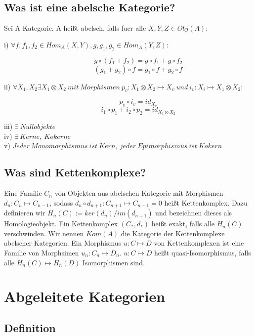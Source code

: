 \documentclass[12pt]{article}
\begin{document}
\subsection{Was ist eine abelsche Kategorie?}

Sei A Kategorie. A heißt abelsch, falls fuer alle $X,Y,Z \in Obj(A)$:
\begin{description}
    \item[i) $\forall f,f_1,f_2 \in Hom_A(X,Y), g,g_1,g_2 \in Hom_A(Y,Z):$]
        \[g \circ (f_1 + f_2) = g \circ f_1 + g \circ f_2\]
        \[(g_1 + g_2) \circ f = g_1 \circ f + g_2 \circ f\]
    \item[ii) $\forall X_1,X_2 \exists X_1 \otimes X_2 \: mit \: Morphismen \: p_v : X_1 \otimes X_2 \mapsto X_v \: und \: i_v : X_i \mapsto X_1 \otimes X_2:$]
        \[p_v \circ i_v = id_{X_v}\]
        \[i_1 \circ p_1 + i_2 \circ p_2 = id_{X_1 \otimes X_2}\]
    \item[iii) $\exists \: Nullobjekte$]
    \item[iv) $\exists \: Kerne,\: Kokerne$]
    \item[v) $Jeder \: Monomorphismus \: ist \: Kern, \: jeder \: Epimorphismus \: ist \: Kokern$]   
\end{description}
    
\subsection{Was sind Kettenkomplexe?}

Eine Familie $C_n$ von Objekten aus abelschen Kategorie mit Morphismen $d_n : C_n \mapsto C_{n-1}$, sodass $d_n \circ d_{n+1} : C_{n+1} \mapsto C_{n-1} = 0$ 
heißt Kettenkomplex. Dazu definieren wir $H_n(C) := ker(d_n) / im(d_{n+1})$ und bezeichnen dieses als Homologieobjekt. Ein Kettenkomplex $(C_*, d_*)$ 
heißt exakt, falls alle $H_n(C)$ verschwinden. Wir nennen $Kom(A)$ die Kategorie der Kettenkomplexe abelscher Kategorien. Ein Morphismus $u : C \mapsto D$ 
von Kettenkomplexen ist eine Familie von Morphsimen $u_n : C_n \mapsto D_n$. $u: C \mapsto D$ heißt quasi-Isomorphismus, falls alle 
$H_n(C) \mapsto H_n(D)$ Isomorphismen sind.
\newpage

\section{Abgeleitete Kategorien}
\subsection{Definition}
\end{document}
